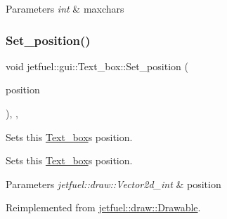 \begin{DoxyParams}{Parameters}
{\em int} & maxchars \\
\hline
\end{DoxyParams}
\mbox{\label{classjetfuel_1_1gui_1_1Text__box_a86476b518f2aa3ea4d00ac67f2b03703}} 
\subsubsection{\texorpdfstring{Set\+\_\+position()}{Set\_position()}}
{\footnotesize\ttfamily void jetfuel\+::gui\+::\+Text\+\_\+box\+::\+Set\+\_\+position (\begin{DoxyParamCaption}\item[{const \hyperlink{classjetfuel_1_1draw_1_1Vector2d}{jetfuel\+::draw\+::\+Vector2d\+\_\+int}}]{position }\end{DoxyParamCaption})\hspace{0.3cm}{\ttfamily [inline]}, {\ttfamily [override]}, {\ttfamily [virtual]}}



Sets this \hyperlink{classjetfuel_1_1gui_1_1Text__box}{Text\+\_\+box}\textquotesingle{}s position. 

Sets this \hyperlink{classjetfuel_1_1gui_1_1Text__box}{Text\+\_\+box}\textquotesingle{}s position.


\begin{DoxyParams}{Parameters}
{\em jetfuel\+::draw\+::\+Vector2d\+\_\+int} & position \\
\hline
\end{DoxyParams}


Reimplemented from \hyperlink{classjetfuel_1_1draw_1_1Drawable_afdd035afe40c706459a6c9df813bcce6}{jetfuel\+::draw\+::\+Drawable}.

\mbox{\label{classjetfuel_1_1gui_1_1Text__box_aca9d68ecbd6dc071c17eaa98d844ffc2}} 
